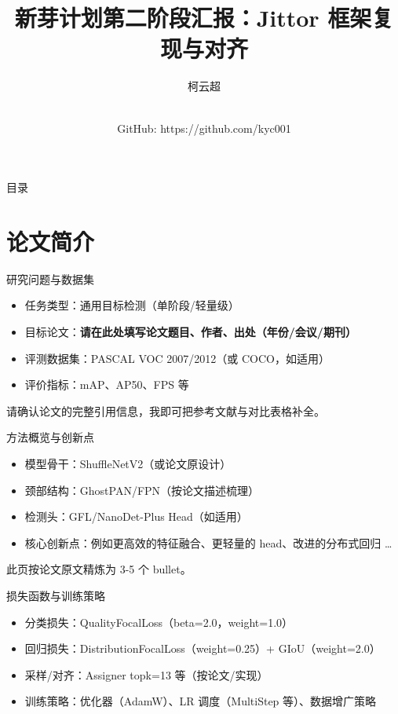 \documentclass{beamer}
\title{新芽计划第二阶段汇报：Jittor 框架复现与对齐}
\author{柯云超}
\institute{南开大学}
\date{\\GitHub: https://github.com/kyc001}
\begin{document}
\begin{frame}
  \titlepage
\end{frame}

\begin{frame}{目录}
  \tableofcontents
\end{frame}

\section{论文简介}

\begin{frame}{研究问题与数据集}
  \begin{itemize}
    \item 任务类型：通用目标检测（单阶段/轻量级）
    \item 目标论文：\textbf{请在此处填写论文题目、作者、出处（年份/会议/期刊）}
    \item 评测数据集：PASCAL VOC 2007/2012（或 COCO，如适用）
    \item 评价指标：mAP、AP50、FPS 等
  \end{itemize}
  \vspace{0.3cm}
  \textcolor{myred}{请确认论文的完整引用信息，我即可把参考文献与对比表格补全。}
\end{frame}

\begin{frame}{方法概览与创新点}
  \begin{itemize}
    \item 模型骨干：ShuffleNetV2（或论文原设计）
    \item 颈部结构：GhostPAN/FPN（按论文描述梳理）
    \item 检测头：GFL/NanoDet-Plus Head（如适用）
    \item 核心创新点：例如更高效的特征融合、更轻量的 head、改进的分布式回归 \dots
  \end{itemize}
  \vspace{0.3cm}
  \textcolor{myred}{此页按论文原文精炼为 3-5 个 bullet。}
\end{frame}

\begin{frame}{损失函数与训练策略}
  \begin{itemize}
    \item 分类损失：QualityFocalLoss（beta=2.0，weight=1.0）
    \item 回归损失：DistributionFocalLoss（weight=0.25）+ GIoU（weight=2.0）
    \item 采样/对齐：Assigner topk=13 等（按论文/实现）
    \item 训练策略：优化器（AdamW）、LR 调度（MultiStep 等）、数据增广策略
  \end{itemize}
\end{frame}
\end{document}
